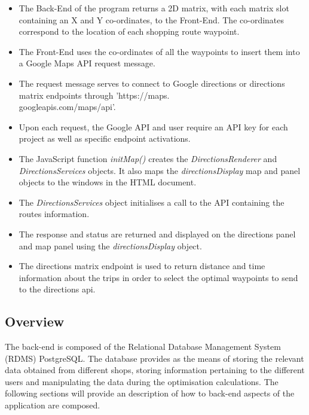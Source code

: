 \documentclass[10pt,twocolumn]{witseiepaper}
\begin{document}
		\begin{itemize}
			\item The Back-End of the program returns a 2D matrix, with each matrix slot containing an X and Y co-ordinates, to the Front-End. The co-ordinates correspond to the location of each shopping route waypoint. 
			\item The Front-End uses the co-ordinates of all the waypoints to insert them into a Google Maps API request message.
			\item The request message serves to connect to Google directions or directions matrix endpoints through 'https://maps.\\googleapis.com/maps/api'.
			\item Upon each request, the Google API and user require an API key for each project as well as specific endpoint activations.
			\item The JavaScript function \textit{initMap()} creates the \textit{DirectionsRenderer} and \textit{DirectionsServices} objects. It also maps the \textit{directionsDisplay} map and panel objects to the windows in the HTML document.
			\item The \textit{DirectionsServices} object initialises a call to the API containing the routes information.
			\item The response and status are returned and displayed on the directions panel and map panel using the \textit{directionsDisplay} object.
			\item The directions matrix endpoint is used to return distance and time information about the trips in order to select the optimal waypoints to send to the directions api.
		\end{itemize}
		
\begin{center}
\end{center}

	\subsection{Overview}
	
	The back-end is composed of the Relational Database Management System (RDMS) PostgreSQL. The database provides as the means of storing the relevant data obtained from different shops, storing information pertaining to the different users and manipulating the data during the optimisation calculations. The following sections will provide an description of how to back-end aspects of the application are composed.
		
\end{document}
